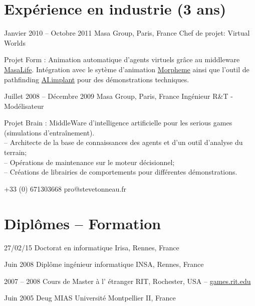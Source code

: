 \documentclass{tccv}
\begin{document}
\section{Exp\'{e}rience en industrie (3 ans)}

\begin{eventlist}

\item{Janvier 2010 -- Octobre 2011}
     {Masa Group, Paris, France}
     {Chef de projet: Virtual Worlds}

Projet Form : Animation automatique d'agents virtuels gr\^{a}ce au middleware \href{http://www.masagroup.net/products/masa-life/}{MasaLife}.
Int\'{e}gration avec le syt\`{e}me d'animation \href{http://www.naturalmotion.com/products/morpheme/}{Morpheme} ainsi que l'outil de pathfinding
\href{http://www.presagis.com/products_services/products/modeling-simulation/simulation/aiimplant/}{AI.implant} pour des d\'{e}monstrations techniques.

\item{Juillet 2008 -- D\'{e}cembre 2009}
     {Masa Group, Paris, France}
     {Ing\'{e}nieur R\&T - Mod\'{e}lisateur}

Projet Brain : MiddleWare d'intelligence artificielle pour les serious games (simulations d'entra\^{i}nement).
\\ -- Architecte de la base de connaissances des agents et d'un outil d'analyse du terrain;
\\ -- Op\'{e}rations de maintenance sur le moteur d\'{e}cisionnel;
\\ -- Cr\'{e}ations de librairies de comportements pour diff\'{e}ren\-tes d\'{e}monstrations.


\end{eventlist}


    {+33 (0) 671303668}
    {pro@stevetonneau.fr}

\section{Dipl\^omes -- Formation}

\begin{yearlist}
 
\item[Mention Tr\`es honorable]{27/02/15}
     {Doctorat en informatique}
	 {Irisa, Rennes, France}
 
\item[]{Juin 2008 }
     {Dipl\^ome ing\'{e}nieur informatique}
	 {INSA, Rennes, France}
	 
\item[Note A (major)]{2007 -- 2008 }
     {Cours de Master \`a l' \'etranger}
     {RIT, Rochester, USA -- \href{http://games.rit.edu/}{games.rit.edu}}

\item[Mention assez bien]{Juin 2005 }
     {Deug MIAS}
     {Universit\'{e} Montpellier II, France}
	 
\end{yearlist}
	
\end{document}
